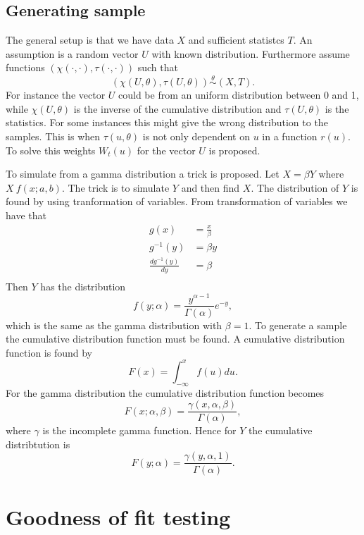 \subsection{Generating sample}
The general setup is that we have data $X$ and sufficient statistcs $T$. An assumption is a random vector $U$ with known distribution. Furthermore assume functions $(\chi(\cdot, \cdot),\tau(\cdot, \cdot))$ such that
\begin{equation*}
    (\chi(U,\theta),\tau(U, \theta)) \overset{\theta}{\sim} (X,T).
\end{equation*}
For instance the vector $U$ could be from an uniform distribution between 0 and 1, while $\chi(U,\theta)$ is the inverse of the cumulative distribution and $\tau(U,\theta)$ is the statistics. For some instances this might give the wrong distribution to the samples. This is when $\tau(u, \theta)$ is not only dependent on $u$ in a function $r(u)$. To solve this weights $W_t(u)$ for the vector $U$ is proposed.




To simulate from a gamma distribution a trick is proposed. Let $X = \beta Y$ where$X ~ f(x;a,b)$. The trick is to simulate $Y$ and then find $X$. The distribution of $Y$ is found by using tranformation of variables. From transformation of variables we have that
\begin{align*}
g(x) &= \frac{x}{\beta} \\
g^{-1}(y) &= \beta y \\
\frac{dg^{-1}(y)}{dy} &= \beta \\
\end{align*}
Then $Y$ has the distribution
\begin{equation*}
    f(y;\alpha) = \frac{y^{\alpha - 1}}{\Gamma(\alpha)} e^{-y},
\end{equation*}
which is the same as the gamma distribution with $\beta = 1$. To generate a sample the cumulative distribution function must be found. A cumulative distribution function is found by
\begin{equation*}
    F(x) = \int_{-\infty}^{x} f(u) du.
\end{equation*}
For the gamma distribution the cumulative distribution function becomes
\begin{equation*}
    F(x;\alpha, \beta) = \frac{\gamma(x, \alpha, \beta)}{\Gamma(\alpha)},
\end{equation*}
where $\gamma$ is the incomplete gamma function. Hence for $Y$ the cumulative distribtution is
\begin{equation*}
    F(y;\alpha) = \frac{\gamma(y, \alpha, 1)}{\Gamma(\alpha)}.
\end{equation*}
\section{Goodness of fit testing}